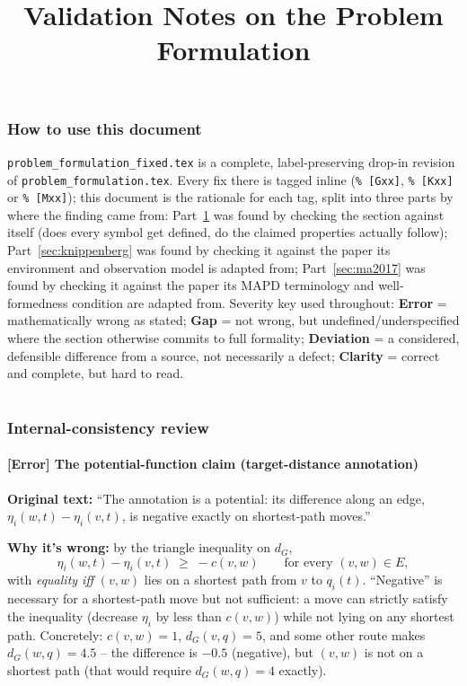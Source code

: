 \documentclass[11pt]{article}
\title{Validation Notes on the Problem Formulation}
\author{}
\date{}
\begin{document}
\maketitle

\tableofcontents

\section*{How to use this document}
\texttt{problem\_formulation\_fixed.tex} is a complete, label-preserving
drop-in revision of \texttt{problem\_formulation.tex}. Every fix there is
tagged inline (\texttt{\% [Gxx]}, \texttt{\% [Kxx]} or \texttt{\% [Mxx]});
this document is the rationale for each tag, split into three parts by where
the finding came from: Part~\ref{sec:internal} was found by checking the
section against itself (does every symbol get defined, do the claimed
properties actually follow); Part~\ref{sec:knippenberg} was found by checking
it against the paper its environment and observation model is adapted from;
Part~\ref{sec:ma2017} was found by checking it against the paper its MAPD
terminology and well-formedness condition are adapted from. Severity key used
throughout: \textbf{Error} = mathematically wrong as stated; \textbf{Gap} =
not wrong, but undefined/underspecified where the section otherwise commits
to full formality; \textbf{Deviation} = a considered, defensible difference
from a source, not necessarily a defect; \textbf{Clarity} = correct and
complete, but hard to read.

\part*{}
\section{Internal-consistency review}
\label{sec:internal}

\subsection*{[Error] The potential-function claim (target-distance annotation)}
\textbf{Original text:} ``The annotation is a potential: its difference along
an edge, $\eta_i(w,t) - \eta_i(v,t)$, is negative exactly on shortest-path
moves.''

\textbf{Why it's wrong:} by the triangle inequality on $d_G$,
\[
  \eta_i(w,t) - \eta_i(v,t) \;\ge\; -c(v,w) \qquad \text{for every } (v,w)\in E,
\]
with \emph{equality iff} $(v,w)$ lies on a shortest path from $v$ to
$q_i(t)$. ``Negative'' is necessary for a shortest-path move but not
sufficient: a move can strictly satisfy the inequality (decrease $\eta_i$ by
less than $c(v,w)$) while not lying on any shortest path. Concretely:
$c(v,w)=1$, $d_G(v,q)=5$, and some other route makes $d_G(w,q)=4.5$ -- the
difference is $-0.5$ (negative), but $(v,w)$ is not on a shortest path (that
would require $d_G(w,q)=4$ exactly).
\end{document}
